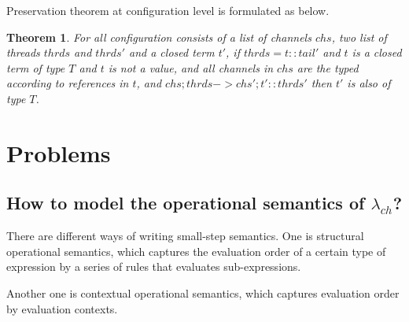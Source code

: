 \documentclass{article}
\newtheorem{theorem}{Theorem}
\newcommand{\lambdach}{$\lambda_{ch}$}
\begin{document}
Preservation theorem at configuration level is formulated as below.

\begin{theorem}
    For all configuration consists of a list of channels $chs$, two list of threads $thrds$ and $thrds'$ and a closed term $t'$,
    if $thrds = t :: tail'$ and $t$ is a closed term of type $T$ and $t$ is not a value, and all channels
    in $chs$ are the typed according to references in $t$, and $chs;thrds -> chs';t' :: thrds'$
    then $t'$ is also of type $T$.
\end{theorem}

\section{Problems}

\subsection{How to model the operational semantics of \lambdach?}

There are different ways of writing small-step semantics. One is structural operational semantics,
which captures the evaluation order of a certain type of expression by a series of rules that evaluates
sub-expressions.



Another one is contextual operational semantics, which captures evaluation order by evaluation contexts.


\end{document}
